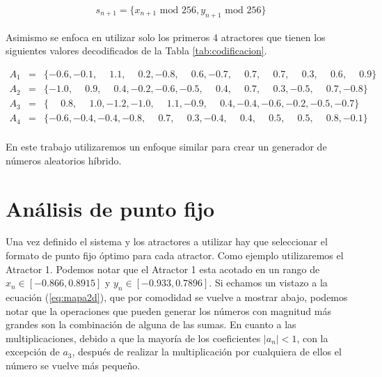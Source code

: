        \begin{equation}
            \begin{array}{lcl}
                s_{n+1} = \{ x_{n+1} \text{ mod } 256, y_{n+1} \text{ mod } 256 \}
            \end{array}
            \label{eq:extraccion}
        \end{equation}

       Asimismo se enfoca en utilizar solo los primeros 4 atractores que tienen los siguientes valores decodificados de la Tabla \ref{tab:codificacion}.

          \begin{equation*}
             \begin{array}{lcl}
                A_{1} & = & \{ -0.6, -0.1, \phantom{-}1.1, \phantom{-}0.2, -0.8, \phantom{-}0.6, -0.7, \phantom{-}0.7, \phantom{-}0.7, \phantom{-}0.3, \phantom{-}0.6, \phantom{-}0.9 \}\\
                A_{2} & = & \{ -1.0, \phantom{-}0.9, \phantom{-}0.4, -0.2, -0.6, -0.5, \phantom{-}0.4, \phantom{-}0.7, \phantom{-}0.3, -0.5, \phantom{-}0.7, -0.8 \}\\
                A_{3} & = &  \{\phantom{-}0.8, \phantom{-}1.0, -1.2, -1.0, \phantom{-}1.1, -0.9, \phantom{-}0.4, -0.4, -0.6, -0.2, -0.5, -0.7 \}\\
                A_{4} & = & \{-0.6, -0.4, -0.4, -0.8, \phantom{-}0.7, \phantom{-}0.3, -0.4, \phantom{-}0.4, \phantom{-}0.5, \phantom{-}0.5, \phantom{-}0.8, -0.1 \}\\
            \end{array}
        \end{equation*}

        En este trabajo utilizaremos un enfoque similar para crear un generador de números aleatorios híbrido.

    \section{Análisis de punto fijo}

        Una vez definido el sistema y los atractores a utilizar hay que seleccionar el formato de punto fijo óptimo para cada atractor. Como ejemplo utilizaremos el Atractor 1. Podemos notar que el Atractor 1 esta acotado en un rango de $x_{n} \in [-0.866, 0.8915]$ y $y_{n} \in [-0.933, 0.7896]$. Si echamos un vistazo a la ecuación (\ref{eq:mapa2d}), que por comodidad se vuelve a mostrar abajo, podemos notar que la operaciones que pueden generar los números con magnitud más grandes son la combinación de alguna de las sumas. En cuanto a las multiplicaciones, debido a que la mayoría de los coeficientes $|a_{n}| < 1$, con la excepción de $a_{3}$, después de realizar la multiplicación por cualquiera de ellos el número se vuelve más pequeño.

